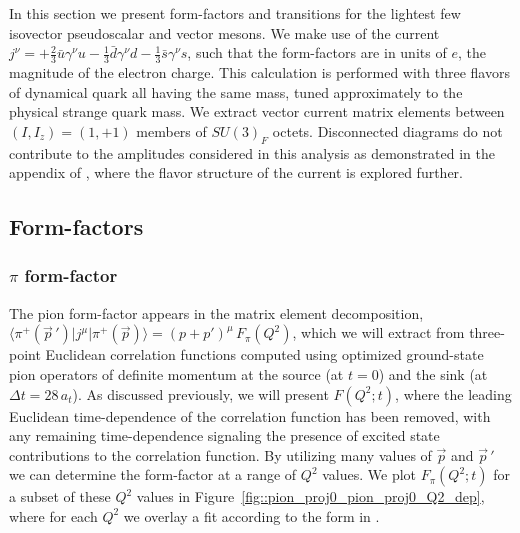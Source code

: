 In this section we present form-factors and transitions for the lightest few isovector pseudoscalar and vector mesons. We make use of the current ${  j^\nu = +\frac{2}{3}\bar{u}\gamma^\nu u -\frac{1}{3}\bar{d}\gamma^\nu d -\frac{1}{3}\bar{s}\gamma^\nu s  }$, such that the form-factors are in units of $e$, the magnitude of the electron charge. This calculation is performed with three flavors of dynamical quark all having the same mass, tuned approximately to the physical strange quark mass. We extract vector current matrix elements between ${(I,I_z) = (1,+1)}$ members of $SU(3)_F$ octets. Disconnected diagrams do not contribute to the amplitudes considered in this analysis as demonstrated in the appendix of \cite{Shultz:2015pfa}, where the flavor structure of the current is explored further.



\subsection{Form-factors}


\subsubsection{$\pi$ form-factor}

The pion form-factor appears in the matrix element decomposition, $\big\langle \pi^+(\vec{p}\,') \big| j^\mu \big| \pi^+(\vec{p}) \big\rangle = (p+p')^\mu \, F_\pi(Q^2)$, which we will extract from three-point Euclidean correlation functions computed using optimized ground-state pion operators of definite momentum at the source (at $t=0$) and the sink (at $\Delta t = 28\, a_t$). As discussed previously, we will present $F(Q^2;t)$, where the leading Euclidean time-dependence of the correlation function has been removed, with any remaining time-dependence signaling the presence of excited state contributions to the correlation function. By utilizing many values of $\vec{p}$ and  $\vec{p}\,'$ we can determine the form-factor at a range of $Q^2$ values. We plot $F_\pi(Q^2;t)$ for a subset of these $Q^2$ values in Figure~\ref{fig::pion_proj0_pion_proj0_Q2_dep}, where for each $Q^2$ we overlay a fit according to the form in .

